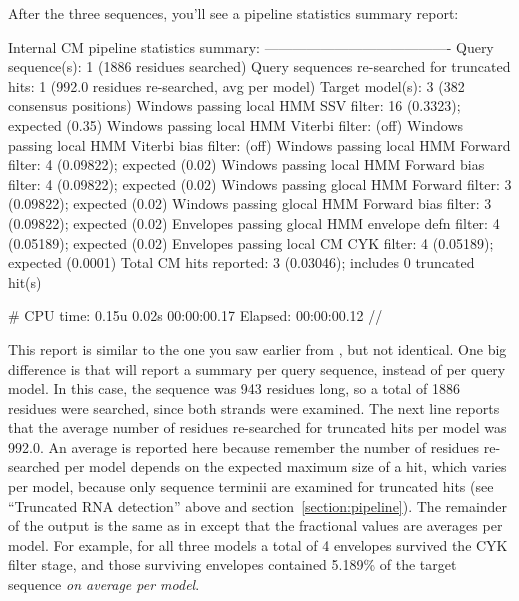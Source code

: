 After the three sequences, you'll see a pipeline statistics summary
report:

\begin{widesreoutput}
Internal CM pipeline statistics summary:
----------------------------------------
Query sequence(s):                                               1  (1886 residues searched)
Query sequences re-searched for truncated hits:                  1  (992.0 residues re-searched, avg per model)
Target model(s):                                                 3  (382 consensus positions)
Windows   passing  local HMM SSV           filter:              16  (0.3323); expected (0.35)
Windows   passing  local HMM Viterbi       filter:                  (off)
Windows   passing  local HMM Viterbi  bias filter:                  (off)
Windows   passing  local HMM Forward       filter:               4  (0.09822); expected (0.02)
Windows   passing  local HMM Forward  bias filter:               4  (0.09822); expected (0.02)
Windows   passing glocal HMM Forward       filter:               3  (0.09822); expected (0.02)
Windows   passing glocal HMM Forward  bias filter:               3  (0.09822); expected (0.02)
Envelopes passing glocal HMM envelope defn filter:               4  (0.05189); expected (0.02)
Envelopes passing  local CM  CYK           filter:               4  (0.05189); expected (0.0001)
Total CM hits reported:                                          3  (0.03046); includes 0 truncated hit(s)

# CPU time: 0.15u 0.02s 00:00:00.17 Elapsed: 00:00:00.12
//
\end{widesreoutput}

This report is similar to the one you saw earlier from
, but not identical. One big difference is that
 will report a summary per query sequence, instead of per
query model. In this case, the sequence was 943 residues long, so a
total of 1886 residues were searched, since both strands were
examined. The next line reports that the average number of residues
re-searched for truncated hits per model was 992.0. An average is
reported here because remember the number of residues re-searched per
model depends on the expected maximum size of a hit, which varies per
model, because only sequence terminii are examined for truncated hits
(see ``Truncated RNA detection'' above and
section~\ref{section:pipeline}).  The remainder of the output is the
same as in  except that the fractional values are
averages per model. For example, for all three models a total of 4
envelopes survived the CYK filter stage, and those surviving envelopes
contained 5.189\% of the target sequence \emph{on average per model}.

